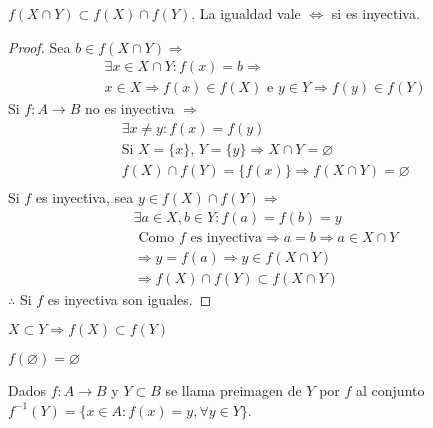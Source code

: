 \begin{prop}
    \(f(X \cap Y) \subset f(X) \cap f(Y)\). La igualdad vale \(\iff \) si es inyectiva.
    \begin{proof}
        Sea \(b \in f(X \cap Y) \Rightarrow \) \begin{align*}
             & \exists x \in X \cap Y : f(x) = b \Rightarrow                                  \\
             & x \in X \Rightarrow f(x) \in f(X) \text{ e } y \in Y \Rightarrow f(y) \in f(Y)
        \end{align*}
        Si \(f: A \to B\) no es inyectiva \(\Rightarrow \)
        \begin{align*}
             & \exists x \neq y : f(x) = f(y)                                             \\
             & \text{Si } X = \{x\}\text{, } Y = \{y\} \Rightarrow X \cap Y = \varnothing \\
             & f(X) \cap f(Y) = \{f(x)\} \Rightarrow f(X \cap Y) = \varnothing            \\
        \end{align*}
        Si \(f\) es inyectiva, sea \(y \in f(X) \cap f(Y) \Rightarrow \)
        \begin{align*}
             & \exists a \in X, b \in Y : f(a) = f(b) = y                                       \\
             & \text{ Como }f \text{ es inyectiva} \Rightarrow a = b \Rightarrow a \in X \cap Y \\
             & \Rightarrow y = f(a) \Rightarrow y \in f(X \cap Y)                               \\
             & \Rightarrow f(X) \cap f(Y) \subset f(X \cap Y)
        \end{align*}
        \(\therefore \) Si \(f\) es inyectiva son iguales.
    \end{proof}
\end{prop}


\begin{prop}
    \(X \subset Y \Rightarrow f(X) \subset f(Y)\)
\end{prop}

\begin{prop}
    \(f(\varnothing) = \varnothing \)
\end{prop}

\begin{definition}
    Dados \(f: A \to B\) y \(Y \subset B\) se llama preimagen de \(Y\) por \(f\) al conjunto \(f^{-1}(Y) = \{x \in A : f(x) = y, \forall y \in Y\} \).
\end{definition}

